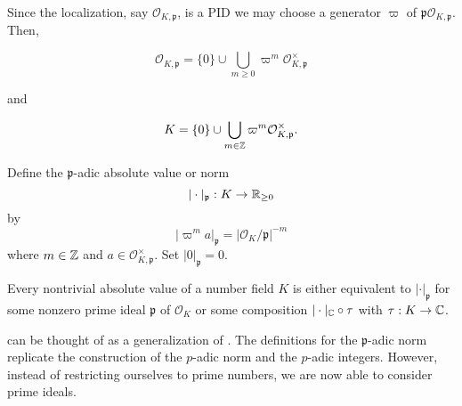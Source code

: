 Since the localization, say $\mathcal{O}_{K,\mathfrak{p}}$, is a PID we may choose a generator $\varpi$ of $\mathfrak{p} \mathcal{O}_{K,\mathfrak{p}}$. Then,

\[\mathcal{O}_{K,\mathfrak{p}} = \{0\} \cup \bigcup_{m\geq 0} \varpi^m \mathcal{O}_{K,\mathfrak{p}}^\times\]

and 

\[K = \{0\} \cup \bigcup_{m\in \mathbb{Z}} \varpi^m \mathcal{O}_{K,\mathfrak{p}}^\times.\]

\begin{definition}
Define the $\mathfrak{p}$-adic absolute value or norm
    \[|\cdot|_\mathfrak{p}: K \to \mathbb{R}_{\geq 0}\]
by 
    \[|\varpi^m a|_\mathfrak{p} = |\mathcal{O}_{K}/\mathfrak{p}|^{-m}\]
where $m \in \mathbb{Z}$ and $a \in \mathcal{O}_{K,\mathfrak{p}}^\times$. Set $|0|_\mathfrak{p} = 0$.
\end{definition}

\begin{theorem}
    Every nontrivial absolute value of a number field $K$ is either equivalent to $|\cdot|_\mathfrak{p}$ for some nonzero prime ideal $\mathfrak{p}$ of $\mathcal{O}_{K}$ or some composition $|\cdot|_{\mathbb{C}} \circ \tau$ with $\tau: K \to \mathbb{C}$.
\end{theorem}

 can be thought of as a generalization of . The definitions for the $\mathfrak{p}$-adic norm replicate the construction of the $p$-adic norm and the $p$-adic integers. However, instead of restricting ourselves to prime numbers, we are now able to consider prime ideals.


